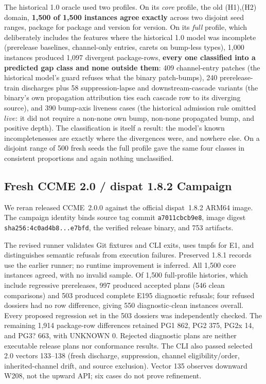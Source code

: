 \documentclass[sigconf,nonacm]{acmart}
\newcommand{\code}[1]{\texttt{#1}}
\begin{document}
The historical 1.0 oracle used two profiles. On its \emph{core} profile, the
old (H1),(H2) domain, \textbf{1{,}500 of 1{,}500
instances agree exactly} across two disjoint seed ranges, package for
package and version for version.
On its \emph{full} profile, which deliberately includes the features
where the historical 1.0 model was incomplete
(prerelease baselines, channel-only entries, carets on bump-less
types), 1{,}000 instances produced 1{,}097 divergent package-rows,
\textbf{every one classified into a predicted gap class and none
outside them}: 409 channel-entry patches (the historical model's guard refuses
what the binary patch-bumps), 240 prerelease-train discharges plus 58
suppression-lapse and downstream-cascade variants (the binary's own
propagation attribution ties each cascade row to its diverging
source), and 390 bump-axis liveness cases (the historical admission rule
omitted $\mathit{live}$: it did not require a non-none own bump, non-none
propagated bump, and positive depth). The classification is itself a result:
the model's known incompletenesses are exactly where the divergences
were, and nowhere else. On a disjoint range of 500 fresh seeds the
full profile gave the same four classes in consistent proportions and
again nothing unclassified.

\subsection{Fresh CCME 2.0 / dispat 1.8.2 Campaign}
\label{sec:eval:fresh}

We reran released CCME~2.0.0 against the official dispat~1.8.2 ARM64 image.
The campaign identity binds source tag commit \code{a7011cbcb9e8}, image digest
\code{sha256:4c0ad4b8...e7bfd}, the verified release binary, and 753 artifacts.

The revised runner validates Git fixtures and CLI exits, uses tmpfs for E1,
and distinguishes semantic refusals from execution failures. Preserved 1.8.1
records use the earlier runner; no runtime improvement is inferred. All 1{,}500 core
instances agreed, with no invalid sample. Of 1{,}500 full-profile histories, which include
regressive prereleases, 997 produced accepted plans (546 clean comparisons)
and 503 produced complete E195 diagnostic refusals; four refused dossiers had
no row difference, giving 550 diagnostic-clean instances overall. Every
proposed regression set in the 503 dossiers was independently checked. The
remaining 1{,}914 package-row differences retained PG1 862, PG2 375, PG2x 14,
and PG3? 663, with UNKNOWN 0. Rejected diagnostic plans are neither executable
release plans nor conformance results. The CLI also
passed selected 2.0 vectors 133--138 (fresh discharge, suppression, channel
eligibility/order, inherited-channel drift, and source exclusion). Vector 135
observes downward W208, not the upward API; six cases do not prove refinement.
\end{document}
